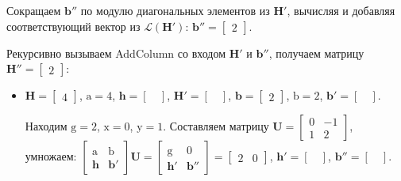\begin{enumerate}
Сокращаем $ \mathbf{b}'' $ по модулю диагональных элементов из $ \mathbf{H}' $, вычисляя и добавляя соответствующий вектор из $ \mathcal{L}(\mathbf{H}') $: $ \mathbf{b}'' = \left[ \begin{array}{cccc}
2
\end{array}\right] $.

Рекурсивно вызываем AddColumn со входом $ \mathbf{H}' $ и $ \mathbf{b}'' $, получаем матрицу $ \mathbf{H}'' = \left[\begin{array}{cccc}
2
\end{array}\right] $:
\begin{itemize}
\item $ \mathbf{H} = \left[\begin{array}{cccc}
4
\end{array}\right] $, $ \mathrm{a} = 4 $, $ \mathbf{h} = \left[\begin{array}{cccc}
\ \end{array}\right] $, $ \mathbf{H}' = \left[ \begin{array}{cccc}
\ \end{array}\right] $, $ \mathbf{b} = \left[\begin{array}{cccc}
2
\end{array}\right] $, $ \mathrm{b} = 2 $, $ \mathbf{b}' = \left[ \begin{array}{cccc}
\ \end{array}\right] $.

Находим $ \mathrm{g} = 2 $, $ \mathrm{x} = 0 $, $ \mathrm{y} = 1 $. Составляем матрицу $  \mathbf{U} = \left[\begin{array}{cccc}
0 & -1 \\
1 & 2
\end{array}\right] $, умножаем: $ \left[ \begin{array}{cccc}
\mathrm{a} & \mathrm{b} \\
\mathbf{h} & \mathbf{b}' \end{array} \right] \mathbf{U}=
\left[ \begin{array}{cccc}
\mathrm{g} & \mathrm{0} \\
\mathbf{h}' & \mathbf{b}'' \end{array} \right] = \left[\begin{array}{cccc}
2 & 0
\end{array}\right] $, $ \mathbf{h}' = \left[\begin{array}{cccc}
\ \end{array}\right] $, $ \mathbf{b}'' = \left[\begin{array}{cccc}
\ \end{array}\right] $.


\end{itemize}
\end{enumerate}
